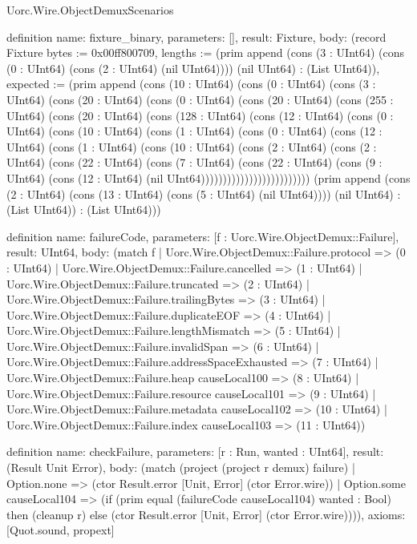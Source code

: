 \begin{lexlean}{Uorc.Wire.ObjectDemuxScenarios}
\begin{semanticmodule}
definition{
  name: fixture_binary,
  parameters: [],
  result: Fixture,
  body: (record Fixture {bytes := 0x00ff800709, lengths := (prim append (cons (3 : UInt64) (cons (0 : UInt64) (cons (2 : UInt64) (nil UInt64)))) (nil UInt64) : (List UInt64)), expected := (prim append (cons (10 : UInt64) (cons (0 : UInt64) (cons (3 : UInt64) (cons (20 : UInt64) (cons (0 : UInt64) (cons (20 : UInt64) (cons (255 : UInt64) (cons (20 : UInt64) (cons (128 : UInt64) (cons (12 : UInt64) (cons (0 : UInt64) (cons (10 : UInt64) (cons (1 : UInt64) (cons (0 : UInt64) (cons (12 : UInt64) (cons (1 : UInt64) (cons (10 : UInt64) (cons (2 : UInt64) (cons (2 : UInt64) (cons (22 : UInt64) (cons (7 : UInt64) (cons (22 : UInt64) (cons (9 : UInt64) (cons (12 : UInt64) (nil UInt64))))))))))))))))))))))))) (prim append (cons (2 : UInt64) (cons (13 : UInt64) (cons (5 : UInt64) (nil UInt64)))) (nil UInt64) : (List UInt64)) : (List UInt64))})
}

definition{
  name: failureCode,
  parameters: [f : Uorc.Wire.ObjectDemux::Failure],
  result: UInt64,
  body: (match f
    | Uorc.Wire.ObjectDemux::Failure.protocol => (0 : UInt64)
    | Uorc.Wire.ObjectDemux::Failure.cancelled => (1 : UInt64)
    | Uorc.Wire.ObjectDemux::Failure.truncated => (2 : UInt64)
    | Uorc.Wire.ObjectDemux::Failure.trailingBytes => (3 : UInt64)
    | Uorc.Wire.ObjectDemux::Failure.duplicateEOF => (4 : UInt64)
    | Uorc.Wire.ObjectDemux::Failure.lengthMismatch => (5 : UInt64)
    | Uorc.Wire.ObjectDemux::Failure.invalidSpan => (6 : UInt64)
    | Uorc.Wire.ObjectDemux::Failure.addressSpaceExhausted => (7 : UInt64)
    | Uorc.Wire.ObjectDemux::Failure.heap causeLocal100 => (8 : UInt64)
    | Uorc.Wire.ObjectDemux::Failure.resource causeLocal101 => (9 : UInt64)
    | Uorc.Wire.ObjectDemux::Failure.metadata causeLocal102 => (10 : UInt64)
    | Uorc.Wire.ObjectDemux::Failure.index causeLocal103 => (11 : UInt64))
}

definition{
  name: checkFailure,
  parameters: [r : Run, wanted : UInt64],
  result: (Result Unit Error),
  body: (match (project (project r demux) failure)
    | Option.none => (ctor Result.error [Unit, Error] (ctor Error.wire))
    | Option.some causeLocal104 => (if (prim equal (failureCode causeLocal104) wanted : Bool) then (cleanup r) else (ctor Result.error [Unit, Error] (ctor Error.wire)))),
  axioms: [Quot.sound, propext]
}


\end{semanticmodule}
\end{lexlean}
